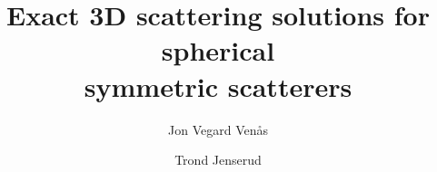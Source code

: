 \label{Part:paperI}
\renewcommand{\contents}{contents/paperI}%
\begin{pFrontmatter}
    \title{Exact 3D scattering solutions for spherical\\symmetric scatterers}
	\author[a,$\ast$]{Jon Vegard Ven{\aa}s}%
	\author[b]{Trond Jenserud}%
	\address[a]{Department of Mathematical Sciences, Norwegian University of Science and Technology,\\Alfred Getz' vei 1, 7034 Trondheim, Norway}%
	\address[b]{Department of Marine Systems, Norwegian Defence Research Establishment,\\Postboks 115, 3191 Horten, Norway}%
	\begin{abstract}%
		
	\end{abstract}%
\end{pFrontmatter}











\begin{inputAppendices}
	
	
	
	
\end{inputAppendices}

